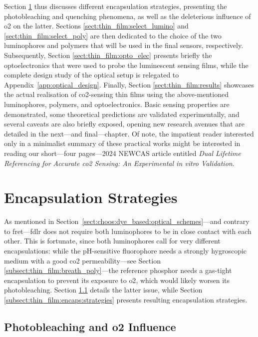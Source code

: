 Section \ref{sect:thin_film:encaps} thus discusses different encapsulation strategies, presenting the photobleaching and quenching phenomena, as well as the deleterious influence of \gls{o2} on the latter. Sections \ref{sect:thin_film:select_lumino} and \ref{sect:thin_film:select_poly} are then dedicated to the choice of the two luminophores and polymers that will be used in the final sensors, respectively. Subsequently, Section \ref{sect:thin_film:opto_elec} presents briefly the optoelectronics that were used to probe the luminescent sensing films, while the complete design study of the optical setup is relegated to Appendix~\ref{app:optical_design}. Finally, Section \ref{sect:thin_film:results} showcases the actual realisation of \gls{co2}-sensing thin films using the above-mentioned luminophores, polymers, and optoelectronics. Basic sensing properties are demonstrated, some theoretical predictions are validated experimentally, and several caveats are also briefly exposed, opening new research avenues that are detailed in the next---and final---chapter. Of note, the impatient reader interested only in a minimalist summary of these practical works might be interested in reading our short---four pages---2024 NEWCAS article entitled \textit{Dual Lifetime Referencing for Accurate \gls{co2} Sensing: An Experimental \textit{in vitro} Validation}\cite{dervieux2024newcas}.

\section{Encapsulation Strategies}\label{sect:thin_film:encaps}

As mentioned in Section~\ref{sect:choos:dye_based:optical_schemes}---and contrary to \gls{fret}---\gls{fdlr} does not require both luminophores to be in close contact with each other. This is fortunate, since both luminophores call for very different encapsulations: while the pH-sensitive fluorophore needs a strongly hygroscopic medium with a good \gls{co2} permeability---see Section \ref{subsect:thin_film:breath_poly}---the reference phosphor needs a gas-tight encapsulation to prevent its exposure to \gls{o2}, which would likely worsen its photobleaching. Section \ref{subsect:thin_film:encaps:photobleaching} details the latter issue, while Section \ref{subsect:thin_film:encaps:strategies} presents resulting encapsulation strategies.

\subsection{Photobleaching and \texorpdfstring{\gls{o2}}{O2} Influence}\label{subsect:thin_film:encaps:photobleaching}

